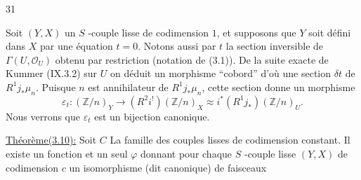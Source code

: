 \begin{flushright}31\end{flushright}
Soit $(Y,X)$ un $S$ -couple lisse de codimension $1$, et supposons que $Y$ soit défini dans $X$ par une équation $t=0$. Notons aussi par $t$ la section inversible de $\Gamma(U,\mathcal O_U)$ obtenu par restriction (notation de (3.1)). De la suite exacte de Kummer (IX.3.2) sur $U$
on déduit un morphisme ``cobord''
d'où une section $\delta t$ de $R^1j_*\mu_n$. Puisque $n$ est annihilateur de $R^1j_*\mu_n$, cette section donne un morphisme
\[
\tag{3.9}
\varepsilon_t:(\mathbb Z/n)_Y\longrightarrow(R^2i^!)(\mathbb Z/n)_X\approx i^*(R^1j_*)(\mathbb Z/n)_U.
\]
Nous verrons que $\varepsilon_t$ est un bijection canonique.

\uline{Théorème(3.10):} Soit $C$ La famille des couples lisses de codimension constant. Il existe un fonction et un seul $\varphi$ donnant pour chaque $S$ -couple lisse $(Y,X)$ de codimension $c$  un isomorphisme (dit canonique) de faisceaux
